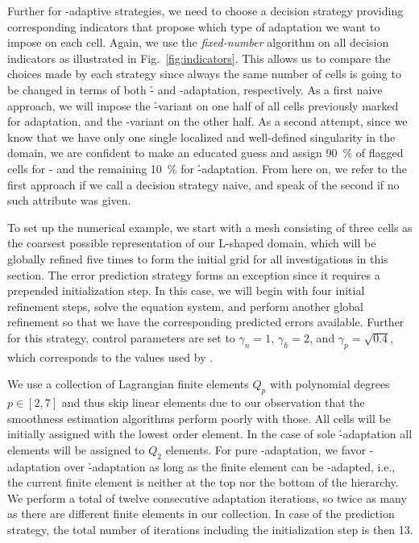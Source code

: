 
Further for \hp-adaptive strategies, we need to choose a decision strategy providing corresponding indicators that propose which type of adaptation we want to impose on each cell.
%
Again, we use the \textit{fixed-number} algorithm on all decision indicators as illustrated in Fig.~\ref{fig:indicators}. This allows us to compare the choices made by each strategy since always the same number of cells is going to be changed in terms of both \h- and \p-adaptation, respectively.
%
As a first naive approach, we will impose the \h-variant on one half of all cells previously marked for adaptation, and the \p-variant on the other half.
As a second attempt, since we know that we have only one single localized and well-defined singularity in the domain, we are confident to make an educated guess and assign \SI{90}{\percent} of flagged cells for \p- and the remaining \SI{10}{\percent} for \h-adaptation. From here on, we refer to the first approach if we call a decision strategy naive, and speak of the second if no such attribute was given.

To set up the numerical example, we start with a mesh consisting of three cells as the coarsest possible representation of our L-shaped domain, which will be globally refined five times to form the initial grid for all investigations in this section. The error prediction strategy forms an exception since it requires a prepended initialization step. In this case, we will begin with four initial refinement steps, solve the equation system, and perform another global refinement so that we have the corresponding predicted errors available. Further for this strategy, control parameters are set to $\gamma_n = 1$, $\gamma_h = 2$, and $\gamma_p = \sqrt{0.4}$, which corresponds to the values used by \textcites{melenk2001}{mitchell2014}.

We use a collection of Lagrangian finite elements $Q_p$ with polynomial degrees $p \in [2,7]$ and thus skip linear elements due to our observation that the smoothness estimation algorithms perform poorly with those. All cells will be initially assigned with the lowest order element. In the case of sole \h-adaptation all elements will be assigned to $Q_2$ elements. For pure \p-adaptation, we favor \p-adaptation over \h-adaptation as long as the finite element can be \p-adapted, i.e., the current finite element is neither at the top nor the bottom of the hierarchy. We perform a total of twelve consecutive adaptation iterations, so twice as many as there are different finite elements in our collection. In case of the prediction strategy, the total number of iterations including the initialization step is then 13.


